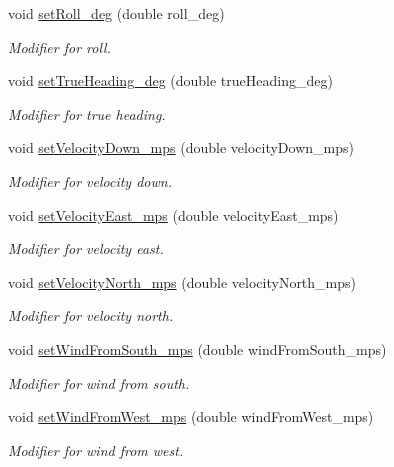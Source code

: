 \begin{DoxyCompactItemize}
void \hyperlink{class_piccolo_telemetry_belief_a7a48f89cbc2eef8c61e5565c71082b1d}{setRoll\_\-deg} (double roll\_\-deg)
\begin{DoxyCompactList}\small\item\em Modifier for roll. \end{DoxyCompactList}\item 
void \hyperlink{class_piccolo_telemetry_belief_a00c8f3d355823071ae1068a3ca3832ff}{setTrueHeading\_\-deg} (double trueHeading\_\-deg)
\begin{DoxyCompactList}\small\item\em Modifier for true heading. \end{DoxyCompactList}\item 
void \hyperlink{class_piccolo_telemetry_belief_afaea9b441386061b4b2ca94672b8bdb9}{setVelocityDown\_\-mps} (double velocityDown\_\-mps)
\begin{DoxyCompactList}\small\item\em Modifier for velocity down. \end{DoxyCompactList}\item 
void \hyperlink{class_piccolo_telemetry_belief_aa34da048ccdb78a2520228e6ae277963}{setVelocityEast\_\-mps} (double velocityEast\_\-mps)
\begin{DoxyCompactList}\small\item\em Modifier for velocity east. \end{DoxyCompactList}\item 
void \hyperlink{class_piccolo_telemetry_belief_a527d6189a31f4c02aa2a18608ce6bcc9}{setVelocityNorth\_\-mps} (double velocityNorth\_\-mps)
\begin{DoxyCompactList}\small\item\em Modifier for velocity north. \end{DoxyCompactList}\item 
void \hyperlink{class_piccolo_telemetry_belief_ae5636e8c2ba40f1e9a96f7b58b9ec03e}{setWindFromSouth\_\-mps} (double windFromSouth\_\-mps)
\begin{DoxyCompactList}\small\item\em Modifier for wind from south. \end{DoxyCompactList}\item 
void \hyperlink{class_piccolo_telemetry_belief_ac69442189a8d3c5ce105d5e4538bc4c4}{setWindFromWest\_\-mps} (double windFromWest\_\-mps)
\begin{DoxyCompactList}\small\item\em Modifier for wind from west. \end{DoxyCompactList}\item 

\end{DoxyCompactItemize}
